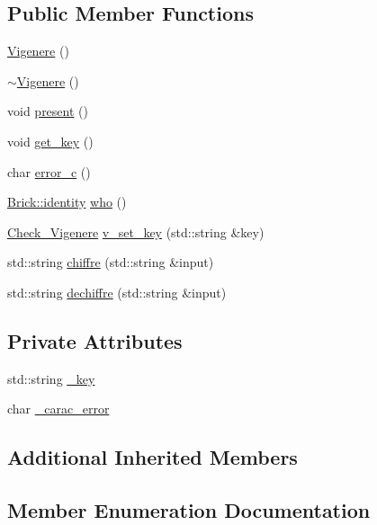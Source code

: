 \subsection*{Public Member Functions}
\begin{DoxyCompactItemize}
\item 
\hyperlink{class_vigenere_a7caf4a6411b74aaed0383f479bcf3c69}{Vigenere} ()
\item 
\hyperlink{class_vigenere_a63987a17306659d0ad5f19ac25b95018}{$\sim$\+Vigenere} ()
\item 
void \hyperlink{class_vigenere_a51e5903d16e669efbd738e4554ec9a13}{present} ()
\item 
void \hyperlink{class_vigenere_ac598d07e328e8b633348a0bab923321a}{get\+\_\+key} ()
\item 
char \hyperlink{class_vigenere_aabf8d436dc97f32534fd7901d92ac4b7}{error\+\_\+c} ()
\item 
\hyperlink{class_brick_af32354a4d8d1275db35660a96a2cfa3e}{Brick\+::identity} \hyperlink{class_vigenere_a79338a4aa2e9cea19e06b14103917288}{who} ()
\item 
\hyperlink{class_vigenere_a7c9057eacefc2b70c2f6376808ae24cd}{Check\+\_\+\+Vigenere} \hyperlink{class_vigenere_ad9f7e190fd51729c37d490c90b285c54}{v\+\_\+set\+\_\+key} (std\+::string \&key)
\item 
std\+::string \hyperlink{class_vigenere_a32b9c62addb46ad28e0dec30a4c0cd57}{chiffre} (std\+::string \&input)
\item 
std\+::string \hyperlink{class_vigenere_aeca94f50deaf6416654ea99d5c1156ed}{dechiffre} (std\+::string \&input)
\end{DoxyCompactItemize}
\subsection*{Private Attributes}
\begin{DoxyCompactItemize}
\item 
std\+::string \hyperlink{class_vigenere_af3de7bc9397a9355b64f538572c718de}{\+\_\+key}
\item 
char \hyperlink{class_vigenere_a230349bb11f185853ffb589503368122}{\+\_\+carac\+\_\+error}
\end{DoxyCompactItemize}
\subsection*{Additional Inherited Members}


\subsection{Member Enumeration Documentation}
\hypertarget{class_vigenere_a7c9057eacefc2b70c2f6376808ae24cd}{}
